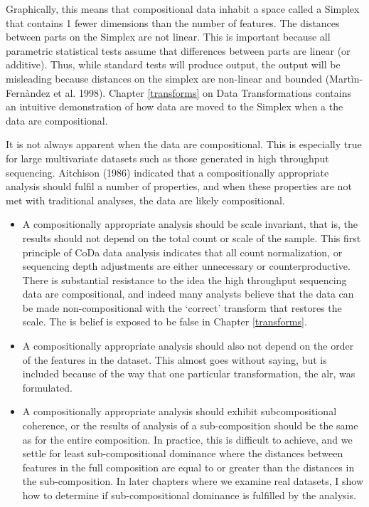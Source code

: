\documentclass[onecolumn]{article}
\begin{document}
Graphically, this means that compositional data inhabit a space called a Simplex that contains 1 fewer dimensions than the number of features. The distances between parts on the Simplex are not linear. This is important because all parametric statistical tests assume that differences between parts are linear (or additive). Thus, while standard tests will produce output, the output will be misleading because distances on the simplex are non-linear and bounded (Martìn-Fernàndez et al. 1998). Chapter \ref{transforms} on Data Transformations contains an intuitive demonstration of how data are moved to the Simplex when a the data are compositional.

It is not always apparent when the data are compositional. This is especially true for large multivariate datasets such as those generated in high throughput sequencing. Aitchison (1986) indicated that a compositionally appropriate analysis should fulfil a number of properties, and when these properties are not met with traditional analyses, the data are likely compositional.

\begin{itemize}
\item
  A compositionally appropriate analysis should be scale invariant, that is, the results should not depend on the total count or scale of the sample. This first principle of CoDa data analysis indicates that all count normalization, or sequencing depth adjustments are either unnecessary or counterproductive. There is substantial resistance to the idea the high throughput sequencing data are compositional, and indeed many analysts believe that the data can be made non-compositional with the `correct' transform that restores the scale. The is belief is exposed to be false in Chapter \ref{transforms}.
\item
  A compositionally appropriate analysis should also not depend on the order of the features in the dataset. This almost goes without saying, but is included because of the way that one particular transformation, the alr, was formulated.
\item
  A compositionally appropriate analysis should exhibit subcompositional coherence, or the results of analysis of a sub-composition should be the same as for the entire composition. In practice, this is difficult to achieve, and we settle for least sub-compositional dominance where the distances between features in the full composition are equal to or greater than the distances in the sub-composition. In later chapters where we examine real datasets, I show how to determine if sub-compositional dominance is fulfilled by the analysis.
\end{itemize}
\end{document}
